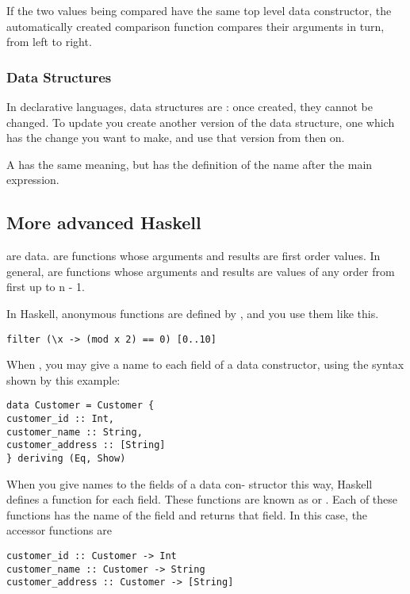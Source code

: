 If the two values being compared have the same top
level data constructor, the automatically created
comparison function compares their arguments in
turn, from left to right.

\subsubsection{Data Structures}
In declarative languages, data structures are : once created, they cannot be changed. To update you create another version of the data structure,
one which has the change you want to make, and
use that version from then on.

A   has
the same meaning, but has the definition of the
name after the main expression.

\subsection{More advanced Haskell}
 are data.
 are functions whose arguments
and results are first order values.
In general,  are functions whose
arguments and results are values of any order from
first up to n - 1.

In Haskell, anonymous functions are defined by
, and you use them like this.
\begin{lstlisting}
filter (\x -> (mod x 2) == 0) [0..10]
\end{lstlisting}

When , you may
give a name to each field of a data constructor,
using the syntax shown by this example:
\begin{lstlisting}
data Customer = Customer {
customer_id :: Int,
customer_name :: String,
customer_address :: [String]
} deriving (Eq, Show)
\end{lstlisting}

When you give names to the fields of a data con-
structor this way, Haskell defines a function for each
field. These functions are known as  or
. Each of these functions
has the name of the field and returns that field. In
this case, the accessor functions are
\begin{lstlisting}
customer_id :: Customer -> Int
customer_name :: Customer -> String
customer_address :: Customer -> [String]
\end{lstlisting}



